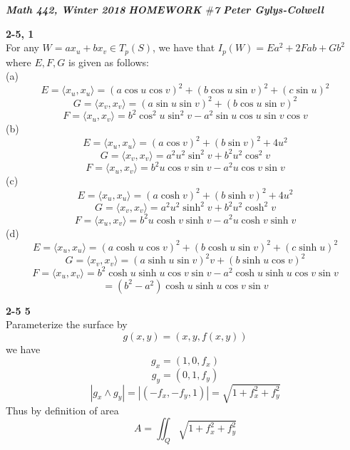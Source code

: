 \documentclass[12pt]{article}
\newenvironment{ques}[1]{\textbf{#1}\vspace{1 mm}\\ }{\bigskip}
\theoremstyle{definition}
\newcommand{\s}{\sin}
\renewcommand{\c}{\cos}
\begin{document}
\noindent \textit{\textbf{Math 442, Winter 2018}} \hspace{1.3cm}
\textit{\textbf{HOMEWORK $\#$7}} \hspace{1.3cm} \textit{\textbf{Peter
Gylys-Colwell}} 

\vspace{1cm}

\begin{ques}{2-5, 1}
	For any $W = ax_u + bx_v \in T_p(S)$, we have that $I_p(W) = Ea^2 + 2Fab +
	Gb^2$ where $E,F,G$ is given as follows: \\
	(a)\
	$$E = \langle x_u, x_u \rangle = (a\c u \c v )^2 + (b \c u \s v)^2 + (c \s u)^2$$
	$$G = \langle x_v, x_v \rangle = (a\s u \s v)^2 + (b \c u \s v)^2$$
	$$F = \langle x_u, x_v \rangle = b^2\c^2 u \s^2 v - a^2 \s u \c u \s v \c v$$
	(b)\
	$$E = \langle x_u, x_u \rangle = (a\c v )^2 + (b \s v)^2 + 4u^2$$
	$$G = \langle x_v, x_v \rangle = a^2u^2\s^2 v + b^2 u^2 \c^2 v$$
	$$F = \langle x_u, x_v \rangle = b^2u\c v \s v - a^2 u \c v \s v$$
	(c)\
	$$E = \langle x_u, x_u \rangle = (a\cosh v )^2 + (b \sinh v)^2 + 4u^2$$
	$$G = \langle x_v, x_v \rangle = a^2u^2\sinh^2 v + b^2 u^2 \cosh^2 v$$
	$$F = \langle x_u, x_v \rangle = b^2u\cosh v \sinh v - a^2 u \cosh v \sinh v$$
	(d)\
	$$E = \langle x_u, x_u \rangle = (a\cosh u \c v )^2 + (b \cosh u \s v)^2 +
	(c \sinh u)^2$$
	$$G = \langle x_v, x_v \rangle = (a \sinh u \s v)^2 v + (b \sinh u \cos v)^2$$
	$$F = \langle x_u, x_v \rangle = b^2\cosh u \sinh u \c v \s v - a^2 \cosh u
	\sinh u \c v \s v$$
	$$= (b^2 - a^2)\cosh u \sinh u \c v \s v $$
\end{ques}

\begin{ques}{2-5 5}
	Parameterize the surface by 
	$$g(x,y) = (x,y,f(x,y))$$
	we have 
	$$g_x = (1, 0, f_x)$$
	$$g_y = (0, 1, f_y)$$
	$$|g_x \wedge g_y| = |(-f_x, -f_y, 1)| = \sqrt{1 + f_x^2 + f_y^2}$$
	Thus by definition of area
	$$A = \iint_Q \sqrt{1 + f_x^2 + f_y^2}$$
\end{ques}
\end{document}

